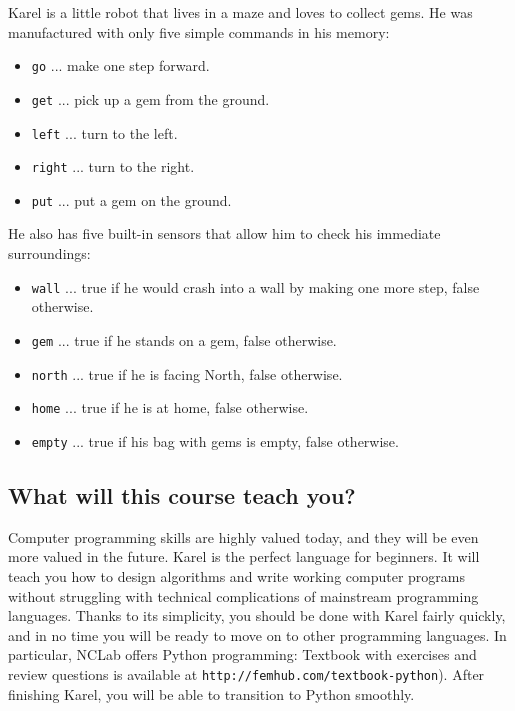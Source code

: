 Karel is a little robot that lives in a maze and loves to collect gems.
He was manufactured with only five simple commands in his memory:

\begin{itemize}
\item {\color{blue} \tt go} ... make one step forward.
\item {\color{blue} \tt get} ... pick up a gem from the ground. 
\item {\color{blue} \tt left} ... turn to the left.
\item {\color{blue} \tt right} ... turn to the right. 
\item {\color{blue} \tt put} ... put a gem on the ground. 
\end{itemize}
He also has five built-in sensors that allow him to check his immediate surroundings:
\begin{itemize}
\item {\color{ForestGreen} \tt wall} ... true if he would crash into a wall by making one more step, false otherwise. 
\item {\color{ForestGreen} \tt gem} ... true if he stands on a gem, false otherwise.
\item {\color{ForestGreen} \tt north} ... true if he is facing North, false otherwise.
\item {\color{ForestGreen} \tt home} ... true if he is at home, false otherwise.
\item {\color{ForestGreen} \tt empty} ... true if his bag with gems is empty, false otherwise. 
\end{itemize}

\subsection{What will this course teach you?}

Computer programming skills are highly valued today, and they will be even more 
valued in the future. Karel is the perfect language for beginners. It will teach
you how to design algorithms and write working computer programs without struggling 
with technical complications of mainstream programming languages. Thanks to its 
simplicity, you should be done with Karel fairly quickly, and in no time you will be 
ready to move on to other programming languages. In particular, NCLab offers
Python programming: Textbook with exercises and review questions is available at 
{\tt http://femhub.com/textbook-python}). After finishing Karel, you will be able to 
transition to Python smoothly. 


